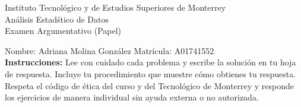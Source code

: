 \documentclass[10pt]{report}
\begin{document}
\newpage



\begin{center}
{\large Instituto Tecnol\'{o}gico y de Estudios Superiores de Monterrey \\
An\'alisis Estad\'stico de Datos } \\
Examen Argumentativo (Papel)
\end{center}

Nombre: \underline{\hspace*{.2in}}
Adriana Molina Gonz\'alez
\underline{\hspace*{.2in}} \quad Matr\'icula:\underline{\hspace*{.2in}}
A01741552
\underline{\hspace*{.2in}} \\

{\bf Instrucciones:} Lee con cuidado cada problema y escribe la soluci\'on
en tu hoja de respuesta. Incluye tu procedimiento que muestre c\'omo obtienes tu respuesta.  Respeta el c\'odigo de \'etica del curso y del Tecnol\'ogico de Monterrey y responde los ejercicios de manera individual sin ayuda externa o no autorizada.
\end{document}
